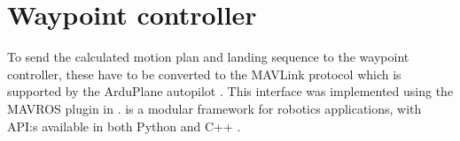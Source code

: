 \section{Waypoint controller}
To send the calculated motion plan and landing sequence to the waypoint controller, these have to be converted to the 
MAVLink protocol which is supported by the ArduPlane autopilot \cite{mavlink}. This interface was implemented using the MAVROS 
plugin in  \cite{mavros}.  is a modular framework for robotics applications, with API:s available in both Python and C++ \cite{ros}.
